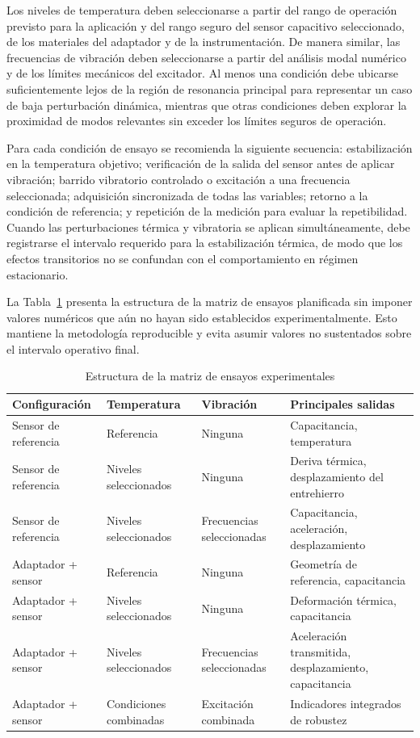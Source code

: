 \documentclass[conference]{IEEEtran}
\begin{document}
Los niveles de temperatura deben seleccionarse a partir del rango de operación previsto para la aplicación y del rango seguro del sensor capacitivo seleccionado, de los materiales del adaptador y de la instrumentación. De manera similar, las frecuencias de vibración deben seleccionarse a partir del análisis modal numérico y de los límites mecánicos del excitador. Al menos una condición debe ubicarse suficientemente lejos de la región de resonancia principal para representar un caso de baja perturbación dinámica, mientras que otras condiciones deben explorar la proximidad de modos relevantes sin exceder los límites seguros de operación.

Para cada condición de ensayo se recomienda la siguiente secuencia: estabilización en la temperatura objetivo; verificación de la salida del sensor antes de aplicar vibración; barrido vibratorio controlado o excitación a una frecuencia seleccionada; adquisición sincronizada de todas las variables; retorno a la condición de referencia; y repetición de la medición para evaluar la repetibilidad. Cuando las perturbaciones térmica y vibratoria se aplican simultáneamente, debe registrarse el intervalo requerido para la estabilización térmica, de modo que los efectos transitorios no se confundan con el comportamiento en régimen estacionario.

La Tabla~\ref{tab:testmatrix} presenta la estructura de la matriz de ensayos planificada sin imponer valores numéricos que aún no hayan sido establecidos experimentalmente. Esto mantiene la metodología reproducible y evita asumir valores no sustentados sobre el intervalo operativo final.

\begin{table}[t]
\caption{Estructura de la matriz de ensayos experimentales}
\label{tab:testmatrix}
\centering
\footnotesize
\begin{tabular}{p{} p{} p{} p{}}
\toprule
\textbf{Configuración} & \textbf{Temperatura} & \textbf{Vibración} & \textbf{Principales salidas} \\
\midrule
Sensor de referencia & Referencia & Ninguna & Capacitancia, temperatura \\
Sensor de referencia & Niveles seleccionados & Ninguna & Deriva térmica, desplazamiento del entrehierro \\
Sensor de referencia & Niveles seleccionados & Frecuencias seleccionadas & Capacitancia, aceleración, desplazamiento \\
Adaptador + sensor & Referencia & Ninguna & Geometría de referencia, capacitancia \\
Adaptador + sensor & Niveles seleccionados & Ninguna & Deformación térmica, capacitancia \\
Adaptador + sensor & Niveles seleccionados & Frecuencias seleccionadas & Aceleración transmitida, desplazamiento, capacitancia \\
Adaptador + sensor & Condiciones combinadas & Excitación combinada & Indicadores integrados de robustez \\
\bottomrule
\end{tabular}
\end{table}
\end{document}
